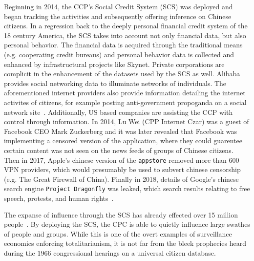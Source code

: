 Beginning in 2014, the CCP's Social Credit System (SCS) was deployed and began
tracking the activities and subsequently offering inference on Chinese
citizens. In a regression back to the deeply personal financial credit system
of the 18 century America, the SCS takes into account not only financial
data, but also personal behavior. The financial data is acquired through the
traditional means (e.g. cooperating credit bureaus) and personal behavior data
is collected and enhanced by infrastructural projects like Skynet. Private
corporations are complicit in the enhancement of the datasets used by the SCS
as well. Alibaba provides social networking data to illuminate networks of
individuals. The aforementioned internet providers also provide information
detailing the  internet activites of citizens, for example posting
anti-government propoganda on a social network site~\cite{qiang2019road}.
Additionally, US based companies are assisting the CCP with control through information.
In 2014, Lu Wei (CPP Internet Czar) was a guest of Facebook CEO Mark Zuckerberg and
it was later revealed that Facebook was implementing a censored version of the application,
where they could guarentee certain content was not seen on the news feeds of groups of Chinese citizens.
Then in 2017, Apple's chinese version of the \texttt{appstore} removed more than 600 VPN providers,
which would presumably be used to subvert chinese censorship (e.g. The Great Firewall of China).
Finally in 2018, details of Google's chinese search engine \texttt{Project Dragonfly} was leaked, which
search results relating to free speech, protests, and human rights~\cite{qiang2019road}.

The expanse of influence through the SCS has already effected over 15 million
people~\cite{qiang2019road}. By deploying the SCS, the CPC is able to quietly
influence large swathes of people and groups. While this is one of the overt
examples of surveillance economics enforcing totalitarianism, it is not far
from the bleek prophecies heard during the 1966 congressional hearings on a
universal citizen database.

%
%
%
